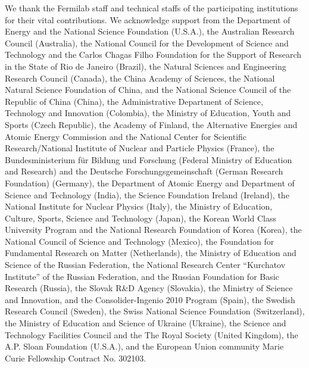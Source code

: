 We thank the Fermilab staff and technical staffs of the participating
institutions for their vital contributions. We acknowledge support
from the Department of Energy and the National Science Foundation
(U.S.A.), the Australian Research Council (Australia), the National
Council for the Development of Science and Technology and the Carlos
Chagas Filho Foundation for the Support of Research in the State of
Rio de Janeiro (Brazil), the Natural Sciences and Engineering Research
Council (Canada), the China Academy of Sciences, the National Natural
Science Foundation of China, and the National Science Council of the
Republic of China (China), the Administrative Department of Science,
Technology and Innovation (Colombia), the Ministry of Education, Youth
and Sports (Czech Republic), the Academy of Finland, the Alternative
Energies and Atomic Energy Commission and the National Center for
Scientific Research/National Institute of Nuclear and Particle Physics
(France), the Bundesministerium f{\"u}r Bildung und Forschung (Federal
Ministry of Education and Research) and the Deutsche
Forschungsgemeinschaft (German Research Foundation) (Germany), the
Department of Atomic Energy and Department of Science and Technology
(India), the Science Foundation Ireland (Ireland), the National
Institute for Nuclear Physics (Italy), the Ministry of Education,
Culture, Sports, Science and Technology (Japan), the Korean World
Class University Program and the National Research Foundation of Korea
(Korea), the National Council of Science and Technology (Mexico), the
Foundation for Fundamental Research on Matter (Netherlands), the
Ministry of Education and Science of the Russian Federation, the
National Research Center ``Kurchatov Institute'' of the Russian
Federation, and the Russian Foundation for Basic Research (Russia),
the Slovak R\&D Agency (Slovakia), the Ministry of Science and
Innovation, and the Consolider-Ingenio 2010 Program (Spain), the
Swedish Research Council (Sweden), the Swiss National Science
Foundation (Switzerland), the Ministry of Education and Science of
Ukraine (Ukraine), the Science and Technology Facilities Council and
the The Royal Society (United Kingdom), the A.P. Sloan Foundation
(U.S.A.), and the European Union community Marie Curie Fellowship
Contract No. 302103.
%
